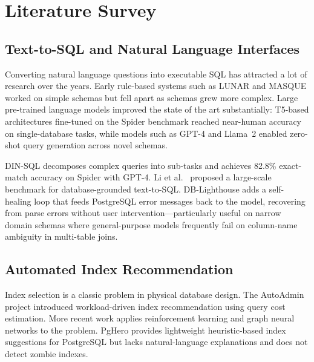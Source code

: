 \documentclass[12pt,a4paper]{report}
\begin{document}
\chapter{Literature Survey}

\section{Text-to-SQL and Natural Language Interfaces}

Converting natural language questions into executable SQL has attracted a lot of research over the years. Early rule-based systems such as LUNAR \cite{woods1973progress} and MASQUE \cite{androutsopoulos1995nldb} worked on simple schemas but fell apart as schemas grew more complex. Large pre-trained language models improved the state of the art substantially: T5-based architectures fine-tuned on the Spider benchmark \cite{yu2018spider} reached near-human accuracy on single-database tasks, while models such as GPT-4 \cite{openai2023gpt4} and Llama~2 \cite{touvron2023llama} enabled zero-shot query generation across novel schemas.

DIN-SQL \cite{pourreza2024din} decomposes complex queries into sub-tasks and achieves 82.8\% exact-match accuracy on Spider with GPT-4. Li et al.\ \cite{li2023can} proposed a large-scale benchmark for database-grounded text-to-SQL. DB-Lighthouse adds a self-healing loop that feeds PostgreSQL error messages back to the model, recovering from parse errors without user intervention---particularly useful on narrow domain schemas where general-purpose models frequently fail on column-name ambiguity in multi-table joins.

\section{Automated Index Recommendation}

Index selection is a classic problem in physical database design. The AutoAdmin project \cite{chaudhuri1997autoadmin} introduced workload-driven index recommendation using query cost estimation. More recent work applies reinforcement learning \cite{lan2020index} and graph neural networks \cite{basu2020weightedge} to the problem. PgHero \cite{pghero2022} provides lightweight heuristic-based index suggestions for PostgreSQL but lacks natural-language explanations and does not detect zombie indexes.
\end{document}
